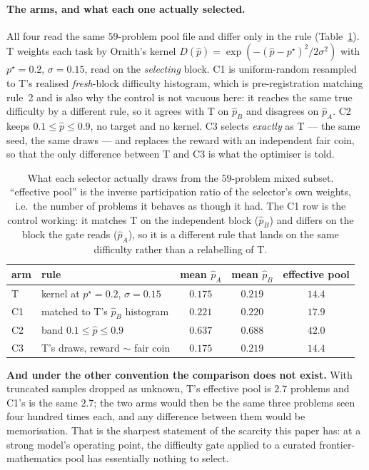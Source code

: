 \paragraph{The arms, and what each one actually selected.}
All four read the same $59$-problem pool file and differ only in the rule
(Table~\ref{tab:b200arms}). T weights each task by Ornith's kernel
$D(\hat p)=\exp(-(\hat p-p^\star)^2/2\sigma^2)$ with $p^\star=0.2$, $\sigma=0.15$, read on the
\emph{selecting} block. C1 is uniform-random resampled to T's realised \emph{fresh}-block
difficulty histogram, which is pre-registration matching rule~2 and is also why the control is
not vacuous here: it reaches the same true difficulty by a different rule, so it agrees with T
on $\hat p_B$ and disagrees on $\hat p_A$. C2 keeps $0.1\le\hat p\le0.9$, no target and no
kernel. C3 selects \emph{exactly} as T --- the same seed, the same draws --- and replaces the
reward with an independent fair coin, so that the only difference between T and C3 is what the
optimiser is told.

\begin{table}[t]
\centering\small
\caption{What each selector actually draws from the $59$-problem mixed subset. ``effective
pool'' is the inverse participation ratio of the selector's own weights, i.e.\ the number of
problems it behaves as though it had. The C1 row is the control working: it matches T on the
independent block ($\hat p_B$) and differs on the block the gate reads ($\hat p_A$), so it is
a different rule that lands on the same difficulty rather than a relabelling of T.}
\label{tab:b200arms}
\begin{tabular}{llccc}
\toprule
arm & rule & mean $\hat p_A$ & mean $\hat p_B$ & effective pool \\
\midrule
T  & kernel at $p^\star=0.2$, $\sigma=0.15$ & $0.175$ & $0.219$ & $14.4$ \\
C1 & matched to T's $\hat p_B$ histogram    & $0.221$ & $0.220$ & $17.9$ \\
C2 & band $0.1\le\hat p\le0.9$              & $0.637$ & $0.688$ & $42.0$ \\
C3 & T's draws, reward $\sim$ fair coin     & $0.175$ & $0.219$ & $14.4$ \\
\bottomrule
\end{tabular}
\end{table}

\textbf{And under the other convention the comparison does not exist.} With truncated samples
dropped as unknown, T's effective pool is $\mathbf{2.7}$ problems and C1's is the same $2.7$;
the two arms would then be the same three problems seen four hundred times each, and any
difference between them would be memorisation. That is the sharpest statement of the scarcity
this paper has: at a strong model's operating point, the difficulty gate applied to a curated
frontier-mathematics pool has essentially nothing to select.


